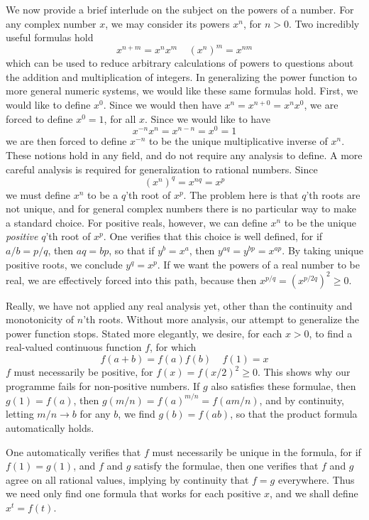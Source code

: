 We now provide a brief interlude on the subject on the powers of a number. For any complex number $x$, we may consider its powers $x^n$, for $n > 0$. Two incredibly useful formulas hold
%
\[ x^{n+m} = x^n x^m\ \ \ \ \ (x^n)^m = x^{nm} \]
%
which can be used to reduce arbitrary calculations of powers to questions about the addition and multiplication of integers. In generalizing the power function to more general numeric systems, we would like these same formulas hold. First, we would like to define $x^0$. Since we would then have $x^n = x^{n + 0} = x^n x^0$, we are forced to define $x^0 = 1$, for all $x$. Since we would like to have
%
\[ x^{-n} x^n = x^{n-n} = x^0 = 1 \]
%
we are then forced to define $x^{-n}$ to be the unique multiplicative inverse of $x^n$. These notions hold in any field, and do not require any analysis to define. A more careful analysis is required for generalization to rational numbers. Since
%
\[ (x^n)^q = x^{nq} = x^p \]
%
we must define $x^n$ to be a $q$'th root of $x^p$. The problem here is that $q$'th roots are not unique, and for general complex numbers there is no particular way to make a standard choice. For positive reals, however, we can define $x^n$ to be the unique {\it positive} $q$'th root of $x^p$. One verifies that this choice is well defined, for if $a/b = p/q$, then $aq = bp$, so that if $y^b = x^a$, then $y^{aq} = y^{bp} = x^{ap}$. By taking unique positive roots, we conclude $y^q = x^p$. If we want the powers of a real number to be real, we are effectively forced into this path, because then $x^{p/q} = (x^{p/2q})^2 \geq 0$.

Really, we have not applied any real analysis yet, other than the continuity and monotonicity of $n$'th roots. Without more analysis, our attempt to generalize the power function stops. Stated more elegantly, we desire, for each $x > 0$, to find a real-valued continuous function $f$, for which
%
\[ f(a + b) = f(a)f(b)\ \ \ \ \ f(1) = x \]
%
$f$ must necessarily be positive, for $f(x) = f(x/2)^2 \geq 0$. This shows why our programme fails for non-positive numbers. If $g$ also satisfies these formulae, then $g(1) = f(a)$, then $g(m/n) = f(a)^{m/n} = f(am/n)$, and by continuity, letting $m/n \to b$ for any $b$, we find $g(b) = f(ab)$, so that the product formula automatically holds.

One automatically verifies that $f$ must necessarily be unique in the formula, for if $f(1) = g(1)$, and $f$ and $g$ satisfy the formulae, then one verifies that $f$ and $g$ agree on all rational values, implying by continuity that $f = g$ everywhere. Thus we need only find one formula that works for each positive $x$, and we shall define $x^t = f(t)$.


